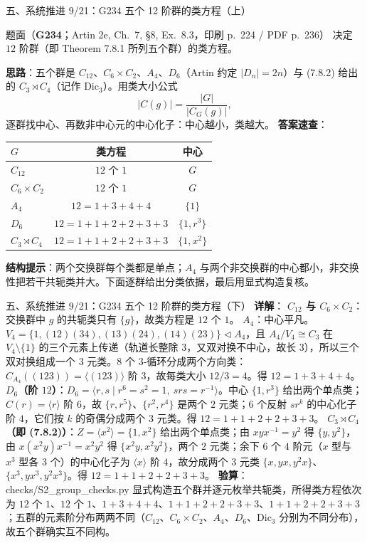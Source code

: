 \documentclass[aspectratio=169,10pt,fontset=none]{ctexbeamer}
\newcommand{\ex}[1]{\textcolor{accent}{\footnotesize\bfseries #1}}
\newcommand{\key}[1]{\textcolor{ink}{\bfseries #1}}
\begin{document}
\begin{frame}[t]{五、系统推进 9/21：G234 五个 12 阶群的类方程（上）}
\label{ex:G234}
\scriptsize
\begin{block}{\footnotesize 题面（\ex{G234}；Artin 2e, Ch.~7, §8, Ex.~8.3，印刷 p.~224 / PDF p.~236）}
决定 $12$ 阶群（即 Theorem 7.8.1 所列五个群）的类方程。
\end{block}
\key{思路}：五个群是 $C_{12}$、$C_6\times C_2$、$A_4$、$D_6$（Artin 约定 $|D_n|=2n$）与 (7.8.2) 给出的 $C_3\rtimes C_4$（记作 $\mathrm{Dic}_3$）。用类大小公式
\[ |C(g)|=\frac{|G|}{|C_G(g)|}, \]
逐群找中心、再数非中心元的中心化子：中心越小，类越大。
\key{答案速查}：
\begin{center}
\begin{tabular}{@{}lcc@{}}
\toprule
$G$ & 类方程 & 中心 \\
\midrule
$C_{12}$ & $12$ 个 $1$ & $G$\\
$C_6\times C_2$ & $12$ 个 $1$ & $G$\\
$A_4$ & $12=1+3+4+4$ & $\{1\}$\\
$D_6$ & $12=1+1+2+2+3+3$ & $\{1,r^3\}$\\
$C_3\rtimes C_4$ & $12=1+1+2+2+3+3$ & $\{1,x^2\}$\\
\bottomrule
\end{tabular}
\end{center}
\key{结构提示}：两个交换群每个类都是单点；$A_4$ 与两个非交换群的中心都小，非交换性把若干共轭类并大。下面逐群给出分类依据，最后用显式构造复核。
\end{frame}

\begin{frame}[t]{五、系统推进 9/21：G234 五个 12 阶群的类方程（下）}
\scriptsize
\key{详解}：
\textbf{$C_{12}$ 与 $C_6\times C_2$}：交换群中 $g$ 的共轭类只有 $\{g\}$，故类方程是 $12$ 个 $1$。
\textbf{$A_4$}：中心平凡。$V_4=\{1,(12)(34),(13)(24),(14)(23)\}\triangleleft A_4$，且 $A_4/V_4\cong C_3$ 在 $V_4\setminus\{1\}$ 的三个元素上传递（轨道长整除 $3$，又双对换不中心，故长 $3$），所以三个双对换组成一个 $3$ 元类。$8$ 个 $3$-循环分成两个方向类：$C_{A_4}((123))=\langle(123)\rangle$ 阶 $3$，故每类大小 $12/3=4$。得 $12=1+3+4+4$。
\textbf{$D_6$（阶 $12$）}：$D_6=\langle r,s\mid r^6=s^2=1,\ srs=r^{-1}\rangle$。中心 $\{1,r^3\}$ 给出两个单点类；$C(r)=\langle r\rangle$ 阶 $6$，故 $\{r,r^5\}$、$\{r^2,r^4\}$ 是两个 $2$ 元类；$6$ 个反射 $sr^k$ 的中心化子阶 $4$，它们按 $k$ 的奇偶分成两个 $3$ 元类。得 $12=1+1+2+2+3+3$。
\textbf{$C_3\rtimes C_4$（即 (7.8.2)）}：$Z=\langle x^2\rangle=\{1,x^2\}$ 给出两个单点类；由 $xyx^{-1}=y^2$ 得 $\{y,y^2\}$，由 $x(x^2y)x^{-1}=x^2y^2$ 得 $\{x^2y,x^2y^2\}$，两个 $2$ 元类；余下 $6$ 个 $4$ 阶元（$x$ 型与 $x^3$ 型各 $3$ 个）的中心化子为 $\langle x\rangle$ 阶 $4$，故分成两个 $3$ 元类 $\{x,yx,y^2x\}$、$\{x^3,yx^3,y^2x^3\}$。得 $12=1+1+2+2+3+3$。
\key{验算}：\textsf{checks/S2\_group\_checks.py} 显式构造五个群并逐元枚举共轭类，所得类方程依次为 $12$ 个 $1$、$12$ 个 $1$、$1+3+4+4$、$1+1+2+2+3+3$、$1+1+2+2+3+3$；五群的元素阶分布两两不同（$C_{12}$、$C_6\times C_2$、$A_4$、$D_6$、$\mathrm{Dic}_3$ 分别为不同分布），故五个群确实互不同构。
\end{frame}
\end{document}
